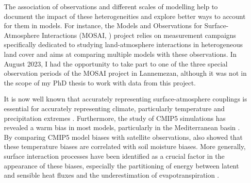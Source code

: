 The association of observations and different scales of modelling help to document the impact of these heterogeneities and explore better ways to account for them in models. For instance, the  Models and Observations for Surface-Atmosphere Interactions (MOSAI, \cite{lohou_model_2022}) project relies on measurement campaigns specifically dedicated to studying land-atmosphere interactions in heterogeneous land cover and aims at comparing multiple models with these observations. In August 2023, I had the opportunity to take part to one of the three special observation periods of the MOSAI project in Lannemezan, although it was not in the scope of my PhD thesis to work with data from this project.

\hfill

It is now well known that accurately representing surface-atmosphere couplings is essential for accurately representing climate, particularly temperature and precipitation extremes \citep{jaeger_impact_2011, van_den_hurk_acceleration_2011}. Furthermore, the study of CMIP5 simulations has revealed a warm bias in most models, particularly in the Mediterranean basin \citep{christensen_temperature_2012, mueller_systematic_2014}. By comparing CMIP5 model biases with satellite observations, \citet{al-yaari_satellite-based_2019} also showed that these temperature biases are correlated with soil moisture biases. More generally, surface interaction processes have been identified as a crucial factor in the appearance of these biases, especially the partitioning of energy between latent and sensible heat fluxes and the underestimation of evapotranspiration \citep{cheruy_combined_2013, cheruy_role_2014,williams_land-atmosphere_2016,ma_causes_2018}. 

